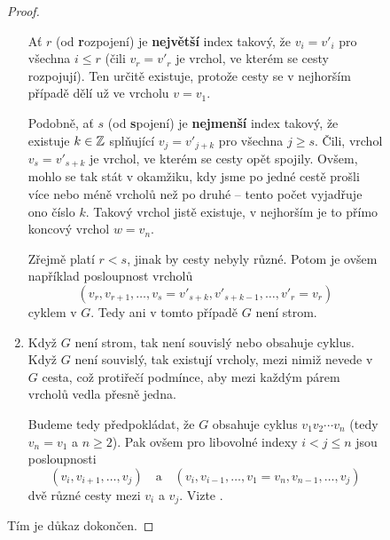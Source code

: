 \begin{figure}[h]
\begin{proof}
\begin{enumerate}
   Ať $r$ (od \textbf{r}ozpojení) je \textbf{největší} index takový, že $v_i =
   v'_i$ pro všechna $i \leq r$ (čili $v_r = v'_r$ je vrchol, ve kterém se cesty
   rozpojují). Ten určitě existuje, protože cesty se v nejhorším případě dělí už
   ve vrcholu $v = v_1$.

   Podobně, ať $s$ (od \textbf{s}pojení) je \textbf{nejmenší} index takový, že
   existuje $k \in \mathbb{Z}$ splňující $v_j = v'_{j+k}$ pro všechna $j \geq s$. Čili,
   vrchol $v_s = v'_{s+k}$ je vrchol, ve kterém se cesty opět spojily. Ovšem,
   mohlo se tak stát v okamžiku, kdy jsme po jedné cestě prošli více nebo méně
   vrcholů než po druhé -- tento počet vyjadřuje ono číslo $k$. Takový vrchol
   jistě existuje, v nejhorším je to přímo koncový vrchol $w = v_n$.

   Zřejmě platí $r < s$, jinak by cesty nebyly různé. Potom je ovšem například
   posloupnost vrcholů
   \[
    (v_r,v_{r+1},\ldots,v_s = v'_{s+k},v'_{s+k-1},\ldots,v'_r = v_r)
   \]
   cyklem v $G$. Tedy ani v tomto případě $G$ není strom.
  \item Když $G$ není strom, tak není souvislý nebo obsahuje cyklus. Když $G$
   není souvislý, tak existují vrcholy, mezi nimiž nevede v $G$ cesta, což
   protiřečí podmínce, aby mezi každým párem vrcholů vedla přesně jedna.

   Budeme tedy předpokládat, že $G$ obsahuje cyklus $v_1v_2 \cdots v_n$ (tedy
   $v_n = v_1$ a $n \geq 2$). Pak ovšem pro libovolné indexy $i < j \leq n$ jsou
   posloupnosti
   \[
    (v_i,v_{i+1},\ldots,v_j) \quad \text{a} \quad (v_i,v_{i-1},\ldots,v_1 =
    v_n,v_{n-1},\ldots,v_j)
   \]
   dvě různé cesty mezi $v_i$ a $v_j$. Vizte
   .
 \end{enumerate}
 Tím je důkaz dokončen.
\end{proof}

\begin{figure}[h]
 \centering
 \begin{subfigure}{.45\textwidth}
  \centering
\end{subfigure}
\end{figure}
\end{figure}
